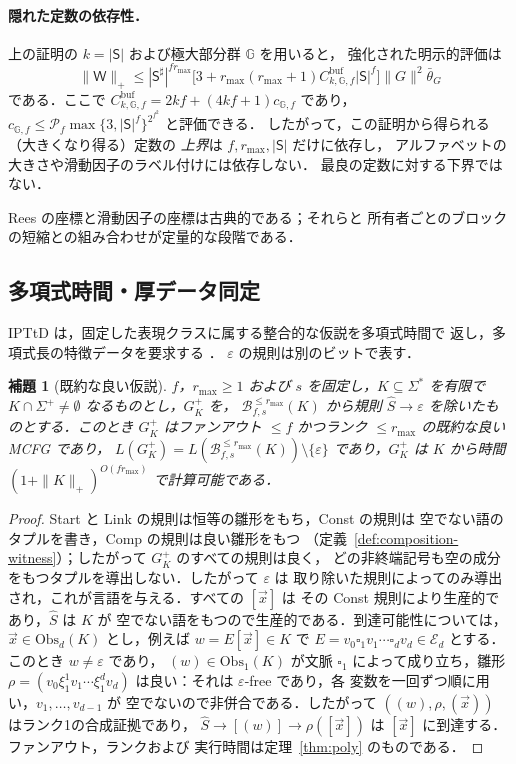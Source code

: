 \documentclass[11pt,a4paper]{ltjsarticle}
\numberwithin{equation}{section}
\theoremstyle{plain}
\newtheorem{lemma}[theorem]{補題}
\theoremstyle{definition}
\theoremstyle{remark}
\newcommand{\Wit}{\mathsf{W}}
\newcommand{\tuple}[1]{\vec{#1}}
\newcommand{\blank}{\square}
\newcommand{\eps}{\varepsilon}
\theoremstyle{plain}
\begin{document}
\paragraph{隠れた定数の依存性．}
上の証明の $k=|\mathsf S|$ および極大部分群 $\mathbb G$ を用いると，
強化された明示的評価は
\[
 \|\Wit\|_+\le|\mathsf S^\sharp|^{fr_{\max}}
 \bigl[3+r_{\max}(r_{\max}+1)
 C^{\mathrm{buf}}_{k,{\mathbb G},f}|\mathsf S|^f\bigr]
 \|G\|^2\bar\theta_G
\]
である．ここで
$C^{\mathrm{buf}}_{k,{\mathbb G},f}=2kf+(4kf+1)c_{{\mathbb G},f}$
であり，
$c_{{\mathbb G},f}\le\mathcal P_f
\max\{3,|\mathsf S|^f\}^{2^{f^2}}$ と評価できる．
したがって，この証明から得られる（大きくなり得る）定数の
\emph{上界}は $f,r_{\max},|\mathsf S|$ だけに依存し，
アルファベットの大きさや滑動因子のラベル付けには依存しない．
最良の定数に対する下界ではない．

Rees の座標と滑動因子の座標は古典的である；それらと
所有者ごとのブロックの短縮との組み合わせが定量的な段階である．


\subsection{多項式時間・厚データ同定}
IPTtD は，固定した表現クラスに属する整合的な仮説を多項式時間で
返し，多項式長の特徴データを要求する
\cite[Definition~2.12]{EyraudHeinzYoshinaka2016}．
$\eps$ の規則は別のビットで表す．

\begin{lemma}[既約な良い仮説]
\label{lem:reduced-good-hypothesis}
$f$，$r_{\max}\ge1$ および $s$ を固定し，$K\subseteq\Sigma^*$ を有限で
$K\cap\Sigma^+\ne\emptyset$ なるものとし，$G^+_K$ を，
$\mathcal B^{\le r_{\max}}_{f,s}(K)$ から規則 $\widehat S\to\eps$ を除いたものとする．このとき
$G^+_K$ はファンアウト $\le f$ かつランク $\le r_{\max}$ の既約な良い MCFG であり，
$L(G^+_K)=L(\mathcal B^{\le r_{\max}}_{f,s}(K))\setminus\{\eps\}$ であり，$G^+_K$ は
$K$ から時間 $(1+\|K\|_+)^{O(fr_{\max})}$ で計算可能である．
\end{lemma}

\begin{proof}
Start と Link の規則は恒等の雛形をもち，Const の規則は
空でない語のタプルを書き，Comp の規則は良い雛形をもつ
（定義~\ref{def:composition-witness}）；したがって $G^+_K$ のすべての規則は良く，
どの非終端記号も空の成分をもつタプルを導出しない．したがって $\eps$ は
取り除いた規則によってのみ導出され，これが言語を与える．すべての $[\tuple x]$ は
その Const 規則により生産的であり，$\widehat S$ は $K$ が
空でない語をもつので生産的である．到達可能性については，$\tuple x\in\mathrm{Obs}_d(K)$ とし，例えば
$w=E[\tuple x]\in K$ で $E=v_0\blank_1v_1\cdots\blank_dv_d\in\mathcal E_d$ とする．このとき $w\ne\eps$ であり，
$(w)\in\mathrm{Obs}_1(K)$ が文脈 $\blank_1$ によって成り立ち，雛形
$\rho=(v_0\xi_1^1v_1\cdots\xi_1^dv_d)$ は良い：それは $\eps$-free であり，各
変数を一回ずつ順に用い，$v_1,\ldots,v_{d-1}$ が
空でないので非併合である．したがって $((w),\rho,(\tuple x))$ はランク1の合成証拠であり，
$\widehat S\to[(w)]\to\rho([\tuple x])$ は $[\tuple x]$ に到達する．ファンアウト，ランクおよび
実行時間は定理~\ref{thm:poly} のものである．
\end{proof}
\end{document}
